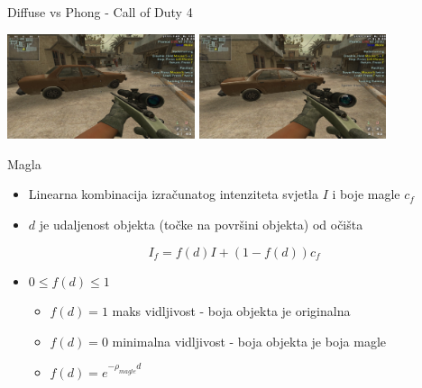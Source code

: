 \documentclass[9pt]{beamer}
\begin{document}
\begin{frame}{Diffuse vs Phong - Call of Duty 4}
	\begin{center}
		\includegraphics[width=5.5cm]{slike/shot0012.jpg}
		\includegraphics[width=5.5cm]{slike/shot0010.jpg}
	\end{center}
\end{frame}

\begin{frame}{Magla}
	\begin{itemize}
		\item Linearna kombinacija izračunatog intenziteta svjetla $I$ i boje magle $c_f$
		\item $d$ je udaljenost objekta (točke na površini objekta) od očišta 
	\end{itemize}
	$$I_f = f(d)I + (1-f(d))c_f$$
	\begin{itemize}
		\item $0 \leq f(d) \leq 1$
		\begin{itemize}
			\item $f(d)=1$ maks vidljivost - boja objekta je originalna
			\item $f(d)=0$ minimalna vidljivost - boja objekta je boja magle
			\item $f(d) = e^{-\rho_{magle}d}$
		\end{itemize}
	\end{itemize}
\end{frame}
\end{document}
